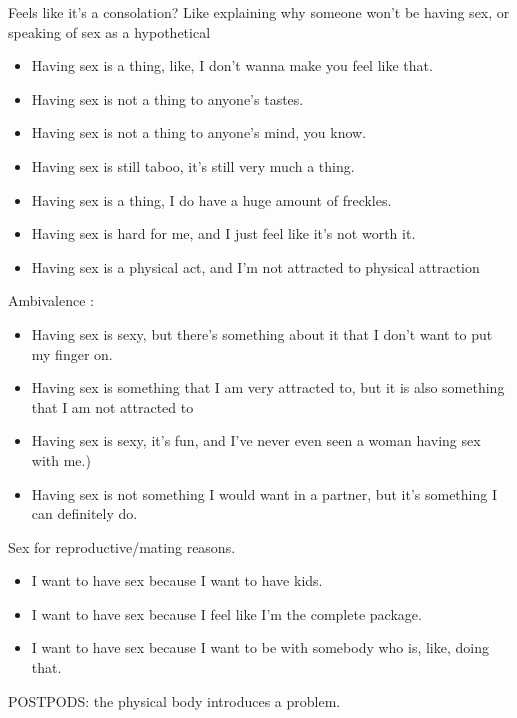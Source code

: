 \documentclass[11pt]{article}
\begin{document}
\begin{enumerate}
\begin{enumerate}
Feels like it's a consolation? Like explaining why someone won't be
having sex, or speaking of sex as a hypothetical
\begin{itemize}
\item Having sex is a thing, like, I don't wanna make you feel like that.
\item Having sex is not a thing to anyone's tastes.
\item Having sex is not a thing to anyone's mind, you know.
\item Having sex is still taboo, it's still very much a thing.
\item Having sex is a thing, I do have a huge amount of freckles.
\item Having sex is hard for me, and I just feel like it's not worth it.
\item Having sex is a physical act, and I'm not attracted to physical
attraction
\end{itemize}

Ambivalence :
\begin{itemize}
\item Having sex is sexy, but there's something about it that I don't
want to put my finger on.
\item Having sex is something that I am very attracted to, but it is also
something that I am not attracted to
\item Having sex is sexy, it's fun, and I've never even seen a woman
having sex with me.)
\item Having sex is not something I would want in a partner, but it's
something I can definitely do.
\end{itemize}

Sex for reproductive/mating reasons.
\begin{itemize}
\item I want to have sex because I want to have kids.
\item I want to have sex because I feel like I'm the complete package.
\item I want to have sex because I want to be with somebody who is, like,
doing that.
\end{itemize}

POSTPODS: the physical body introduces a problem.


\end{enumerate}
\end{enumerate}
\end{document}
